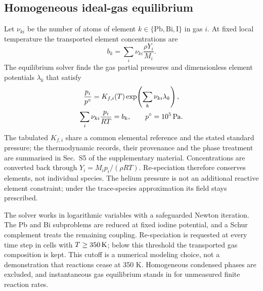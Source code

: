 \subsection{Homogeneous ideal-gas equilibrium}
\label{sec:equilibrium}
Let $\nu_{ki}$ be the number of atoms of element $k\in\{\mathrm{Pb},
\mathrm{Bi},\mathrm{I}\}$ in gas $i$. At fixed local temperature the
transported element concentrations are
\begin{equation}
 b_k=\sum_i\nu_{ki}\frac{\rho Y_i}{M_i}.
 \label{eq:elements}
\end{equation}
The equilibrium solver finds the gas partial pressures and
dimensionless element potentials $\lambda_k$ that satisfy
\begin{equation}
 \begin{gathered}
 \frac{p_i}{p^\circ}=K_{f,i}(T)
 \exp\!\left(\sum_k\nu_{ki}\lambda_k\right),\\
 \sum_i\nu_{ki}\frac{p_i}{RT}=b_k,
 \qquad p^\circ=10^5\,\mathrm{Pa}.
 \end{gathered}
 \label{eq:equilibrium}
\end{equation}
The tabulated $K_{f,i}$ share a common elemental reference and the
stated standard pressure; the thermodynamic records, their provenance
and the phase treatment are summarised in Sec.~S5 of the supplementary
material. Concentrations are converted back through
$Y_i=M_i p_i/(\rho RT)$. Re-speciation therefore conserves elements,
not individual species. The helium pressure is not an additional
reactive element constraint; under the trace-species approximation its
field stays prescribed.

The solver works in logarithmic variables with a safeguarded Newton
iteration. The Pb and Bi subproblems are reduced at fixed iodine
potential, and a Schur complement treats the remaining coupling.
Re-speciation is requested at every
time step in cells with $T\ge350\,\mathrm{K}$; below this threshold the
transported gas composition is kept. This cutoff is a numerical
modeling choice, not a demonstration that reactions cease at 350 K.
Homogeneous condensed phases are excluded, and instantaneous gas
equilibrium stands in for unmeasured finite reaction rates.

